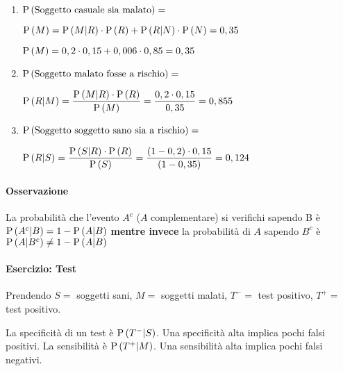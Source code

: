 \begin{enumerate}
	\item $ \text{P}\left(\text{Soggetto casuale sia malato}\right) = $
	
	$ \text{P}\left(M\right) = \text{P}\left(M|R\right) \cdot \text{P}\left(R\right) + \text{P}\left(R|N\right) \cdot \text{P}\left(N\right) = 0,35 $ 
	
	$ \text{P}\left(M\right) = 0,2 \cdot 0,15 + 0,006 \cdot 0,85 = 0,35 $
	
	\item $ \text{P}\left(\text{Soggetto malato fosse a rischio}\right) = $
	
	$ \text{P}\left(R|M\right) = \dfrac{\text{P}\left(M|R\right) \cdot \text{P}\left(R\right)}{\text{P}\left(M\right)} = \dfrac{0,2 \cdot 0,15}{0,35} = 0,855 $
	
	\item $ \text{P}\left(\text{Soggetto soggetto sano sia a rischio}\right) = $
	
	$ \text{P}\left(R|S\right) = \dfrac{\text{P}\left(S|R\right) \cdot \text{P}\left(R\right)}{\text{P}\left(S\right)} = \dfrac{(1-0,2) \cdot 0,15}{(1-0,35)} = 0,124$
\end{enumerate}

\paragraph{Osservazione}

La probabilità che l'evento $ A^c $ ($ A $ complementare) si verifichi sapendo B è $ \text{P}\left(A^c|B\right) = 1 - \text{P}\left(A|B\right) $ 
\textbf{mentre invece} la probabilità di $ A $ sapendo $ B^c $ è $ \text{P}\left(A|B^c\right) \neq 1 - \text{P}\left(A|B\right) $

\paragraph{Esercizio: Test}
Prendendo $ S = $ soggetti sani, $ M = $ soggetti malati, $ T^- = $ test positivo, $ T^+ = $ test positivo.

La specificità di un test è $ \text{P}\left(T^-|S\right) $. Una specificità alta implica pochi falsi positivi. La sensibilità è $ \text{P}\left(T^+|M\right) $. Una sensibilità alta implica pochi falsi negativi.
